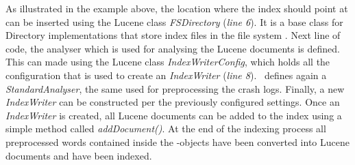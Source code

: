 As illustrated in the example above, the location where the index should point at can be inserted using the Lucene class \textit{FSDirectory} (\textit{line 6}). It is a base class for Directory implementations that store index files in the file system \cite{lucenefsdir}. 
Next line of code, the analyser which is used for analysing the Lucene documents is defined. 
This can made using the Lucene class \textit{IndexWriterConfig}, which holds all the configuration that is used to create an \textit{IndexWriter} (\textit{line 8}). \toolname\ defines again a \textit{StandardAnalyser}, the same used for preprocessing the crash logs.
Finally, a new \textit{IndexWriter} can be constructed per the previously configured settings. 
Once an \textit{IndexWriter} is created, all Lucene documents can be added to the index using a simple method called \textit{addDocument()}. At the end of the indexing process all preprocessed words contained inside the \Crash-objects have been converted into Lucene documents and have been indexed.


